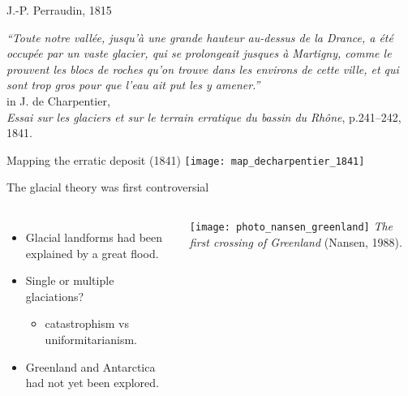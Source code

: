     \begin{frame}{}
      J.-P. Perraudin, 1815\\
      \bigskip
      \par\emph{``Toute notre vallée, jusqu'à une grande hauteur au-dessus de la
              Drance, a été occupée par un vaste glacier, qui se prolongeait
              jusques à Martigny, comme le prouvent les blocs de roches qu'on
              trouve dans les environs de cette ville, et qui sont trop gros
              pour que l'eau ait put les y amener.''}\\
      \bigskip
      in J. de Charpentier,\\
      \emph{Essai sur les glaciers et sur le terrain erratique
            du bassin du Rhône},
      p.241--242, 1841.
    \end{frame}

    \begin{frame}{Mapping the erratic deposit (1841)}
      \texttt{[image: map\_decharpentier\_1841]}
    \end{frame}

    \begin{frame}{The glacial theory was first controversial}
      \begin{columns}
        \column{60mm}
          \begin{itemize}
            \item Glacial landforms had been explained by a great flood.
            \pause\bigskip
            \item Single or multiple glaciations?
              \begin{itemize}
                \item catastrophism vs uniformitarianism.
              \end{itemize}
            \pause\bigskip
            \item Greenland and Antarctica had not yet been explored.
          \end{itemize}
        \column{60mm}
          \texttt{[image: photo\_nansen\_greenland]}
          \emph{The first crossing of Greenland} (Nansen, 1988).
      \end{columns}
    \end{frame}

